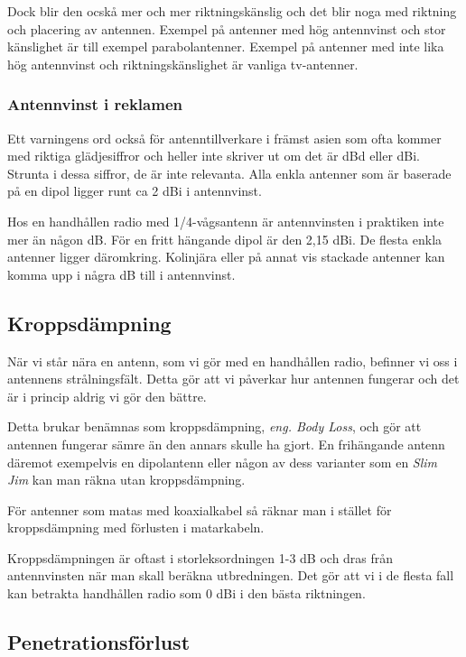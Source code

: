 \documentclass[12ypt,swedish,a4paper]{report}
\begin{document}
Dock blir den ocskå mer och mer riktningskänslig och det blir noga med riktning och placering av antennen. Exempel på antenner med hög antennvinst och stor känslighet är till exempel parabolantenner. Exempel på antenner med inte lika hög antennvinst och riktningskänslighet är vanliga tv-antenner.

\subsubsection{Antennvinst i reklamen}

Ett varningens ord också för antenntillverkare i främst asien som ofta kommer med riktiga glädjesiffror och heller inte skriver ut om det är dBd eller dBi. Strunta i dessa siffror, de är inte relevanta. Alla enkla antenner som är baserade på en dipol ligger runt ca 2 dBi i antennvinst. 

Hos en handhållen radio med 1/4-vågsantenn är antennvinsten i praktiken inte mer än någon dB. För en fritt hängande dipol är den 2,15 dBi. De flesta enkla antenner ligger däromkring. Kolinjära eller på annat vis stackade antenner kan komma upp i några dB till i antennvinst.

\subsection{Kroppsdämpning}

När vi står nära en antenn, som vi gör med en handhållen radio, befinner vi oss i antennens strålningsfält. Detta gör att vi påverkar hur antennen fungerar och det är i princip aldrig vi gör den bättre. 

Detta brukar benämnas som kroppsdämpning, \textit{eng. Body Loss}, och gör att antennen fungerar sämre än den annars skulle ha gjort. En frihängande antenn däremot exempelvis en dipolantenn eller någon av dess varianter som en \textit{Slim Jim} kan man räkna utan kroppsdämpning.

För antenner som matas med koaxialkabel så räknar man i stället för kroppsdämpning med förlusten i matarkabeln. 

Kroppsdämpningen är oftast i storleksordningen 1-3 dB och dras från antennvinsten när man skall beräkna utbredningen. Det gör att vi i de flesta fall kan betrakta handhållen radio som 0 dBi i den bästa riktningen.

\subsection{Penetrationsförlust}
\end{document}
